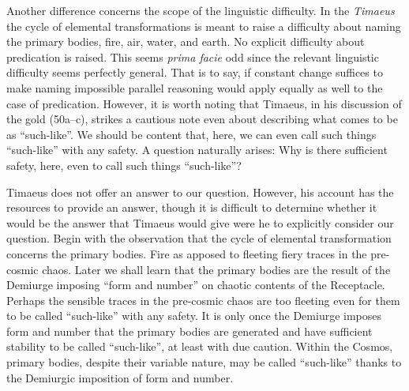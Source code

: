 Another difference concerns the scope of the linguistic difficulty. In the \emph{Timaeus} the cycle of elemental transformations is meant to raise a difficulty about naming the primary bodies, fire, air, water, and earth. No explicit difficulty about predication is raised. This seems \emph{prima facie} odd since the relevant linguistic difficulty seems perfectly general. That is to say, if constant change suffices to make naming impossible parallel reasoning would apply equally as well to the case of predication. However, it is worth noting that Timaeus, in his discussion of the gold (50a--c), strikes a cautious note even about describing what comes to be as ``such-like''. We should be content that, here, we can even call such things ``such-like'' with any safety. A question naturally arises: Why is there sufficient safety, here, even to call such things ``such-like''?


Timaeus does not offer an answer to our question. However, his account has the resources to provide an answer, though it is difficult to determine whether it would be the answer that Timaeus would give were he to explicitly consider our question. Begin with the observation that the cycle of elemental transformation concerns the primary bodies. Fire as apposed to fleeting fiery traces in the pre-cosmic chaos. Later we shall learn that the primary bodies are the result of the Demiurge imposing ``form and number'' on chaotic contents of the Receptacle. Perhaps the sensible traces in the pre-cosmic chaos are too fleeting even for them to be called ``such-like'' with any safety. It is only once the Demiurge imposes form and number that the primary bodies are generated and have sufficient stability to be called ``such-like'', at least with due caution. Within the Cosmos, primary bodies, despite their variable nature, may be called ``such-like'' thanks to the Demiurgic imposition of form and number.

